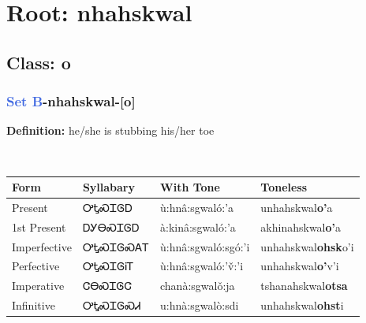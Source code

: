 \needspace{4in}
\section*{Root: nhahskwal}
\nopagebreak
{}
\needspace{3in}
\subsection*{Class: o}
\nopagebreak
\needspace{2in}
\subsubsection*{\textcolor{RoyalBlue}{Set B}{-}\textbf{nhahskwal}{-}[o]}
\nopagebreak
\textbf{Definition: } he/she is stubbing his/her toe
\\[0.5em]
\begin{tabularx}{\textwidth}{l X X X}%
\toprule%
\textbf{Form}&\textbf{Syllabary}&\textbf{With Tone}&\textbf{Toneless}\\%
\midrule%
Present&ᎤᎿᏍᏆᎶᎠ&ù:hnâ:sgwaló:’a&unhahskwal\textbf{o'}a\\%
1st Present&ᎠᎩᎾᏍᏆᎶᎠ&à:kinâ:sgwaló:’a&akhinahskwal\textbf{o'}a\\%
Imperfective&ᎤᎿᏍᏆᎶᏍᎪᎢ&ù:hnâ:sgwaló:sgó:’i&unhahskwal\textbf{ohsk}o'i\\%
Perfective&ᎤᎿᏍᏆᎶᎥᎢ&ù:hnâ:sgwaló:’v̌:’i&unhahskwal\textbf{o'}v'i\\%
Imperative&ᏣᎾᏍᏆᎶᏣ&chanà:sgwalǒ:ja&tshanahskwal\textbf{otsa}\\%
Infinitive&ᎤᎿᏍᏆᎶᏍᏗ&u:hnà:sgwalò:sdi&unhahskwal\textbf{ohst}i\\%
\bottomrule%
\end{tabularx}
\\[1em]